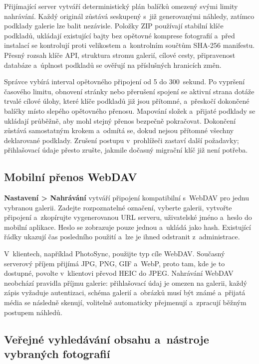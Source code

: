 \documentclass[11pt,a4paper]{article}
\newcommand{\ui}[1]{\textbf{#1}}
\begin{document}
Přijímající server vytváří deterministický plán balíčků omezený svými limity
nahrávání. Každý originál zůstává seskupený s~již generovanými náhledy, zatímco
podklady galerie lze balit nezávisle. Položky ZIP používají stabilní klíče
podkladů, ukládají existující bajty bez opětovné komprese fotografií a~před
instalací se kontrolují proti velikostem a~kontrolním součtům SHA-256 manifestu.
Přesný rozsah klíče API, struktura stromu galerií, cílové cesty, připravenost
databáze a~úplnost podkladů se ověřují na příslušných hranicích změn.

Správce vybírá interval opětovného připojení od 5 do 300~sekund. Po vypršení
časového limitu, obnovení stránky nebo přerušení spojení se aktivní strana
dotáže trvalé cílové úlohy, které klíče podkladů již jsou přítomné, a~přeskočí
dokončené balíčky místo slepého opětovného přenosu. Mapování složek a~přijaté
podklady se ukládají průběžně, aby mohl stejný přenos bezpečně pokračovat.
Dokončení zůstává samostatným krokem a~odmítá se, dokud nejsou přítomné všechny
deklarované podklady. Zrušení postupu v~prohlížeči zastaví další požadavky;
přihlašovací údaje přesto zrušte, jakmile dočasný migrační klíč již není
potřeba.

\subsection{Mobilní přenos WebDAV}

\ui{Nastavení > Nahrávání} vytváří připojení kompatibilní s~WebDAV pro jednu
vybranou galerii. Zadejte rozpoznatelné označení, vyberte galerii, vytvořte
připojení a~zkopírujte vygenerovanou URL serveru, uživatelské jméno a~heslo do
mobilní aplikace. Heslo se zobrazuje pouze jednou a~ukládá jako hash. Existující
řádky ukazují čas posledního použití a~lze je ihned odstranit z~administrace.

V~klientech, například PhotoSync, použijte typ cíle WebDAV. Současný serverový
příjem přijímá JPG, PNG, GIF a~WebP, proto tam, kde je to dostupné, povolte
v~klientovi převod HEIC do JPEG. Nahrávání WebDAV neobchází pravidla příjmu
galerie: přihlašovací údaj je omezen na galerii, každý zápis vyžaduje
autentizaci, schéma galerií a~obrázků musí být známé a~přijatá média se následně
skenují, volitelně automaticky přejmenují a~zpracují běžným postupem náhledů.

\subsection{Veřejné vyhledávání obsahu a~nástroje vybraných fotografií}
\end{document}
